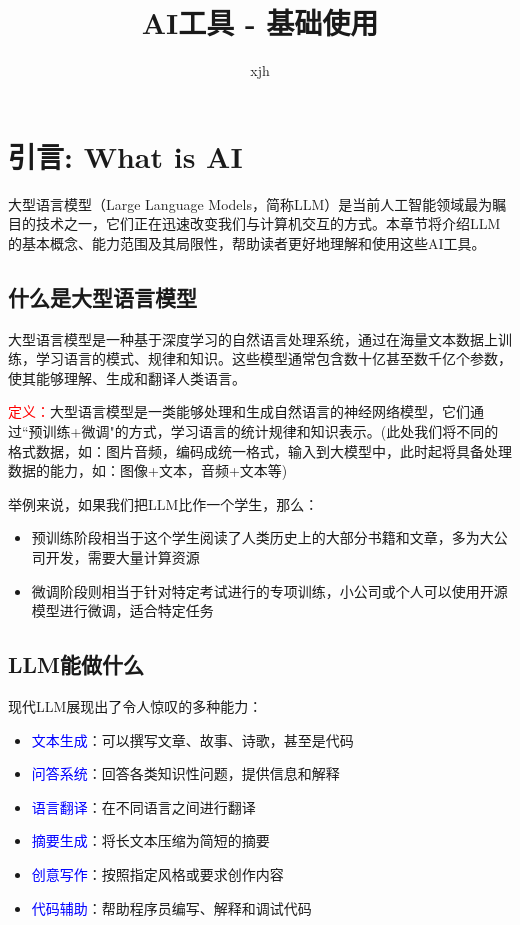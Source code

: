 \documentclass{article}
\title{AI工具 - 基础使用}
\author{xjh}
\begin{document}
\maketitle

\section{引言: What is AI}
大型语言模型（Large Language Models，简称LLM）是当前人工智能领域最为瞩目的技术之一，它们正在迅速改变我们与计算机交互的方式。本章节将介绍LLM的基本概念、能力范围及其局限性，帮助读者更好地理解和使用这些AI工具。

\subsection{什么是大型语言模型}
大型语言模型是一种基于深度学习的自然语言处理系统，通过在海量文本数据上训练，学习语言的模式、规律和知识。这些模型通常包含数十亿甚至数千亿个参数，使其能够理解、生成和翻译人类语言。

\textcolor{red}{定义：}大型语言模型是一类能够处理和生成自然语言的神经网络模型，它们通过``预训练+微调"的方式，学习语言的统计规律和知识表示。(此处我们将不同的格式数据，如：图片音频，编码成统一格式，输入到大模型中，此时起将具备处理数据的能力，如：图像+文本，音频+文本等)

举例来说，如果我们把LLM比作一个学生，那么：
\begin{itemize}
  \item 预训练阶段相当于这个学生阅读了人类历史上的大部分书籍和文章，多为大公司开发，需要大量计算资源
  \item 微调阶段则相当于针对特定考试进行的专项训练，小公司或个人可以使用开源模型进行微调，适合特定任务
\end{itemize}

\subsection{LLM能做什么}
现代LLM展现出了令人惊叹的多种能力：

\begin{itemize}
  \item \textcolor{blue}{文本生成}：可以撰写文章、故事、诗歌，甚至是代码
  \item \textcolor{blue}{问答系统}：回答各类知识性问题，提供信息和解释
  \item \textcolor{blue}{语言翻译}：在不同语言之间进行翻译
  \item \textcolor{blue}{摘要生成}：将长文本压缩为简短的摘要
  \item \textcolor{blue}{创意写作}：按照指定风格或要求创作内容
  \item \textcolor{blue}{代码辅助}：帮助程序员编写、解释和调试代码
\end{itemize}
\end{document}
